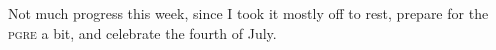 \documentclass[../notebook.tex]{subfiles}
\begin{document}
\label{sec:sum5}

Not much progress this week, since I took it mostly off to rest, prepare for
the \textsc{pgre} a bit, and celebrate the fourth of July.
\end{document}
